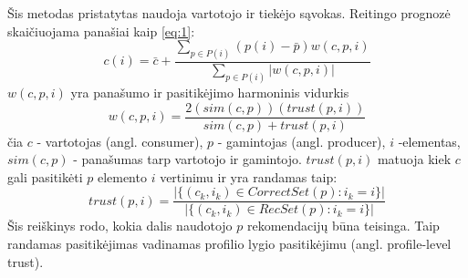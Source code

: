 \documentclass{VUMIFInfMagistrinis}
\begin{document}
Šis metodas pristatytas \cite{12} naudoja vartotojo ir tiekėjo sąvokas. Reitingo prognozė skaičiuojama panašiai kaip \eqref{eq:1}:
\begin{equation}
c(i) = \bar{c}+\frac{\sum \limits_{p \in P(i)} (p(i) - \bar{p}) w(c,p,i)}{\sum \limits_{p \in P(i)} |w(c,p,i)|}
\end{equation}
$w(c,p,i)$ yra panašumo ir pasitikėjimo harmoninis vidurkis 
\begin{equation}
w(c,p,i) = \frac{2(sim(c,p))(trust(p,i))}{sim(c,p)+trust(p,i)}
\end{equation}
čia $c$ - vartotojas (angl. consumer), $p$ - gamintojas (angl. producer), $i$ -elementas, $sim(c, p)$ - panašumas tarp vartotojo ir gamintojo. $trust(p,i)$ matuoja kiek $c$ gali pasitikėti $p$ elemento $i$ vertinimu ir yra randamas taip:
\begin{equation}
trust(p,i)=\frac{|\{(c_k, i_k) \in CorrectSet(p): i_k = i\}|}{|\{(c_k,i_k) \in RecSet(p): i_k=i\}|}
\end{equation}
Šis reiškinys rodo, kokia dalis naudotojo $p$ rekomendacijų būna teisinga. Taip randamas pasitikėjimas vadinamas profilio lygio pasitikėjimu (angl. profile-level trust).
\end{document}
